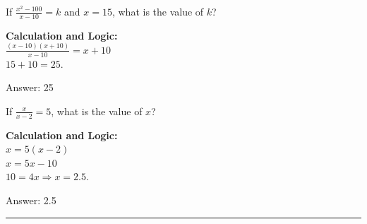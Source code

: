 \documentclass[11pt,paper=a4,answers]{exam}
\begin{document}
\begin{questions}
\vspace{40pt}

\question
If $\frac{x^2 - 100}{x - 10} = k$ and $x = 15$, what is the value of $k$?

\begin{solution}
\textbf{Calculation and Logic:} \\
$\frac{(x-10)(x+10)}{x-10} = x + 10$ \\
$15 + 10 = 25$.

\vspace{30pt}

Answer: \colorbox{yellow!100}{25}
\end{solution}

\vspace{40pt}

\question
If $\frac{x}{x-2} = 5$, what is the value of $x$?

\begin{solution}
\textbf{Calculation and Logic:} \\
$x = 5(x - 2)$ \\
$x = 5x - 10$ \\
$10 = 4x \Rightarrow x = 2.5$.

\vspace{30pt}

Answer: \colorbox{yellow!100}{2.5}
\end{solution}

\end{questions}
\begin{center}
\rule{.5\textwidth}{1pt}
\end{center}
\end{document}
